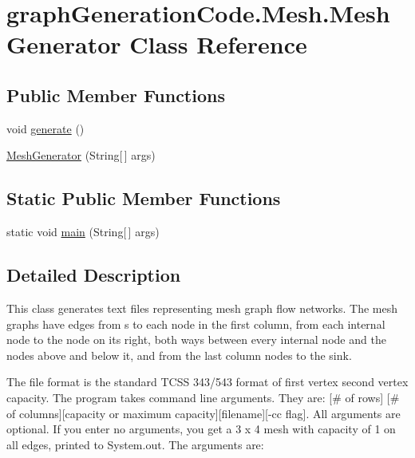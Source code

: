 \hypertarget{classgraphGenerationCode_1_1Mesh_1_1MeshGenerator}{}\section{graph\+Generation\+Code.\+Mesh.\+Mesh\+Generator Class Reference}
\label{classgraphGenerationCode_1_1Mesh_1_1MeshGenerator}
\subsection*{Public Member Functions}
\begin{DoxyCompactItemize}
\item 
void \hyperlink{classgraphGenerationCode_1_1Mesh_1_1MeshGenerator_a4658a0e6ef335d61aaad0951e7bea550}{generate} ()
\item 
\hyperlink{classgraphGenerationCode_1_1Mesh_1_1MeshGenerator_a50aaa5dc64717b0685b7d744bd336580}{Mesh\+Generator} (String\mbox{[}$\,$\mbox{]} args)
\end{DoxyCompactItemize}
\subsection*{Static Public Member Functions}
\begin{DoxyCompactItemize}
\item 
static void \hyperlink{classgraphGenerationCode_1_1Mesh_1_1MeshGenerator_ad5644a452d15eb4cd640dfb1c1c0d2c9}{main} (String\mbox{[}$\,$\mbox{]} args)
\end{DoxyCompactItemize}


\subsection{Detailed Description}
This class generates text files representing mesh graph flow networks. The mesh graphs have edges from s to each node in the first column, from each internal node to the node on its right, both ways between every internal node and the nodes above and below it, and from the last column nodes to the sink.

The file format is the standard T\+C\+SS 343/543 format of \textquotesingle{}first vertex\textquotesingle{} \textquotesingle{}second vertex\textquotesingle{} \textquotesingle{}capacity\textquotesingle{}. The program takes command line arguments. They are\+: \mbox{[}\# of rows\mbox{]} \mbox{[}\# of columns\mbox{]}\mbox{[}capacity or maximum capacity\mbox{]}\mbox{[}filename\mbox{]}\mbox{[}-\/cc flag\mbox{]}. All arguments are optional. If you enter no arguments, you get a 3 x 4 mesh with capacity of 1 on all edges, printed to System.\+out. The arguments are\+:

